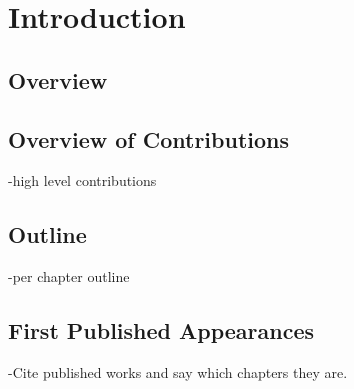 \chapter{Introduction}

\section{Overview}
\section{Overview of Contributions}

-high level contributions

\section{Outline}

-per chapter outline

\section{First Published Appearances}

-Cite published works and say which chapters they are.
